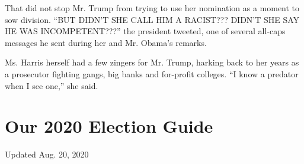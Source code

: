 That did not stop Mr. Trump from trying to use her nomination as a
moment to sow division. ``BUT DIDN'T SHE CALL HIM A RACIST??? DIDN'T SHE
SAY HE WAS INCOMPETENT???'' the president tweeted, one of several
all-caps messages he sent during her and Mr. Obama's remarks.

Ms. Harris herself had a few zingers for Mr. Trump, harking back to her
years as a prosecutor fighting gangs, big banks and for-profit colleges.
``I know a predator when I see one,'' she said.

\hypertarget{our-2020-election-guide}{%
\section{Our 2020 Election Guide}\label{our-2020-election-guide}}

Updated Aug. 20, 2020

